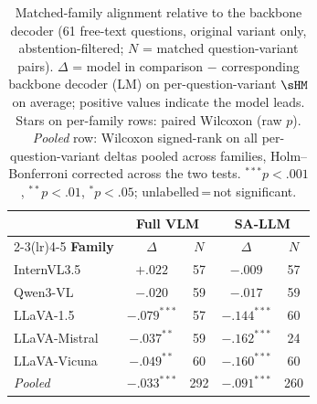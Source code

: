 \begin{table}[ht]
\centering\small\setlength{\tabcolsep}{5pt}
\begin{tabular}{l cc cc}
\toprule
& \multicolumn{2}{c}{\textbf{Full VLM}} & \multicolumn{2}{c}{\textbf{SA-LLM}} \\
\cmidrule(lr){2-3}\cmidrule(lr){4-5}
\textbf{Family} & $\Delta$ & $N$ & $\Delta$ & $N$ \\
\midrule
InternVL3.5 & $+.022$ & 57 & $-.009$ & 57 \\
Qwen3-VL & $-.020$ & 59 & $-.017$ & 59 \\
LLaVA-1.5 & $-.079^{***}$ & 57 & $-.144^{***}$ & 60 \\
LLaVA-Mistral & $-.037^{**}$ & 59 & $-.162^{***}$ & 24 \\
LLaVA-Vicuna & $-.049^{**}$ & 60 & $-.160^{***}$ & 60 \\
\midrule
\textit{Pooled} & $-.033^{***}$ & 292 & $-.091^{***}$ & 260 \\
\bottomrule
\end{tabular}
\caption{Matched-family alignment relative to the backbone decoder (61 free-text questions, original variant only, abstention-filtered; $N$ = matched question-variant pairs).
$\Delta$ = model in comparison $-$ corresponding backbone decoder (LM) on per-question-variant $\sHM$ on average; positive values indicate the model leads.
Stars on per-family rows: paired Wilcoxon (raw $p$). \textit{Pooled} row: Wilcoxon signed-rank on all per-question-variant deltas pooled across families, Holm--Bonferroni corrected across the two tests. ${}^{***}p{<}.001$, ${}^{**}p{<}.01$, ${}^{*}p{<}.05$; unlabelled\,=\,not significant.}
\label{tab:matched_family_alignment_tests_ft_orig_absf}
\end{table}